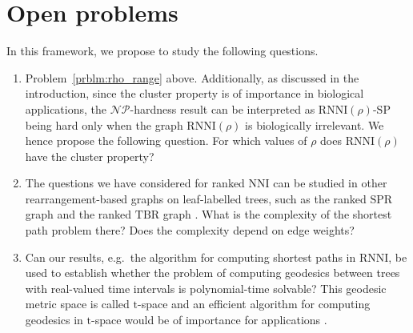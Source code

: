 \documentclass[11pt]{amsart}
\newcommand{\rnni}{\mathrm{RNNI}}
\newcommand{\nni}{\mathrm{NNI}}
\newcommand{\spr}{\mathrm{SPR}}
\newcommand{\tbr}{\mathrm{TBR}}
\newcommand{\np}{\mathcal{NP}}
\newcommand{\decprob}[1]{\rnni(#1)\text{-}\mathrm{SP}}
\begin{document}
\section{Open problems}

In this framework, we propose to study the following questions.
\begin{enumerate}
\item Problem~\ref{prblm:rho_range} above.
Additionally, as discussed in the introduction, since the cluster property is of importance in biological applications, the $\np$-hardness result can be interpreted as $\decprob{\rho}$ being hard only when the graph $\rnni(\rho)$ is biologically irrelevant.
We hence propose the following question.
For which values of $\rho$ does $\rnni(\rho)$ have the cluster property?

\item The questions we have considered for ranked $\nni$ can be studied in other rearrangement-based graphs on leaf-labelled trees, such as the ranked $\spr$ graph and the ranked $\tbr$ graph \autocite{Semple2003-nj}.
What is the complexity of the shortest path problem there?
Does the complexity depend on edge weights?

\item Can our results, e.g.\ the algorithm for computing shortest paths in $\rnni$, be used to establish whether the problem of computing geodesics between trees with real-valued time intervals is polynomial-time solvable?
This geodesic metric space is called $\mathrm t$-space and an efficient algorithm for computing geodesics in $\mathrm t$-space would be of importance for applications \autocite{Gavryushkin2016-uu}.
\end{enumerate}


\newpage
\printbibliography
\end{document}
